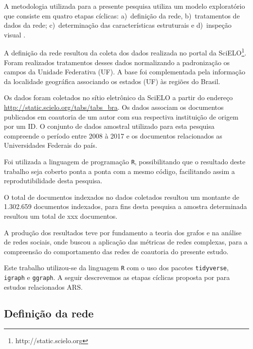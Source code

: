 \documentclass[12pt]{article}
\begin{document}
A metodologia utilizada para a presente pesquisa utiliza um modelo exploratório que consiste em quatro etapas cíclicas: 
a)~definição da rede, 
b)~tratamentos de dados da rede; 
c)~determinação das características estruturais e 
d)~inspeção visual \cite{de2018exploratory}.

A definição da rede resultou da coleta dos dados realizada no portal da SciELO\footnote{http://static.scielo.org}. 
Foram  realizados tratamentos desses dados normalizando a padronização os campos da Unidade Federativa (UF). 
A base foi complementada pela informação da localidade geográfica associando os estados (UF) às regiões do Brasil. 

Os dados foram coletados no sítio eletrônico da SciELO a partir do endereço \url{http://static.scielo.org/tabs/tabs_bra}. Os dados associam os documentos publicados em coautoria de um autor com sua respectiva instituição de origem por um ID. O conjunto de dados amostral utilizado para esta pesquisa compreende o período entre 2008 à 2017 e os documentos relacionados as Universidades Federais do país.  

Foi utilizada a linguagem de programação \texttt R, possibilitando que o resultado deste trabalho seja coberto ponta a ponta com a mesmo código, facilitando assim a reprodutibilidade desta pesquisa.

O total de documentos indexados no dados coletados resultou um montante de 1.302.659 documentos indexados, para fins desta pesquisa a amostra determinada resultou um total de xxx documentos.

A produção dos resultados teve por fundamento a teoria dos grafos e na análise de redes sociais, onde buscou a aplicação das métricas de redes complexas, para a compreensão do comportamento das redes de coautoria do presente estudo.

Este trabalho utilizou-se da linguagem \texttt R com o uso dos pacotes \texttt{tidyverse}, \texttt{igraph} e \texttt{ggraph}. A seguir descrevemos as etapas cíclicas proposta por \cite{de2018exploratory} para estudos relacionados ARS.

\subsection{Definição da rede}
\end{document}
